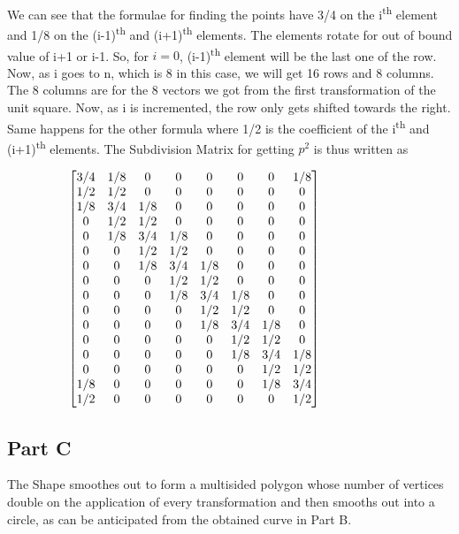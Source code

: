 \documentclass[12pt,a4paper]{article}
\begin{document}
We can see that the formulae for finding the points have 3/4 on the i\textsuperscript{th} element and 1/8 on the (i-1)\textsuperscript{th} and (i+1)\textsuperscript{th} elements. The elements rotate for out of bound value of i+1 or i-1. So, for $i=0$, (i-1)\textsuperscript{th} element will be the last one of the row. Now, as i goes to n, which is 8 in this case, we will get 16 rows and 8 columns. The 8 columns are for the 8 vectors we got from the first transformation of the unit square. Now, as i is incremented, the row only gets shifted towards the right. Same happens for the other formula where 1/2 is the coefficient of the i\textsuperscript{th} and (i+1)\textsuperscript{th} elements.
The Subdivision Matrix for getting $p^2$ is thus written as


\[ \hspace{-2cm}
 \begin{bmatrix} 
    3/4 & 1/8 & 0  & 0& 0 & 0 & 0 & 1/8 \\
    1/2 & 1/2 & 0 & 0 & 0 & 0 & 0 & 0\\
    1/8 & 3/4 & 1/8 & 0 & 0& 0 & 0 & 0\\
    0& 1/2 & 1/2 & 0 & 0 & 0 & 0 & 0\\
    0 & 1/8 & 3/4 & 1/8 & 0 & 0& 0 & 0\\
    0 & 0 & 1/2 & 1/2 & 0 & 0 & 0 & 0\\
    0 & 0 & 1/8 & 3/4 & 1/8 & 0 & 0& 0 \\
    0 & 0 & 0 & 1/2 & 1/2 & 0 & 0 & 0\\
    0 & 0 & 0 & 1/8 & 3/4 & 1/8 & 0 & 0\\
    0 & 0 & 0 & 0 & 1/2 & 1/2 & 0 & 0\\
    0 & 0 & 0 & 0 & 1/8 & 3/4 & 1/8 & 0 \\
    0 & 0 & 0 & 0 & 0 & 1/2 & 1/2 & 0\\
    0 & 0 & 0 & 0 & 0 & 1/8 & 3/4 & 1/8\\
    0 & 0 & 0 & 0 & 0 & 0 & 1/2 & 1/2\\
    1/8 & 0 & 0 & 0 & 0 & 0 & 1/8 & 3/4\\
    1/2 & 0 & 0 & 0 & 0 & 0 & 0 & 1/2\\
\end{bmatrix}
 \]
\subsection{Part C}

The Shape smoothes out to form a multisided polygon whose number of vertices double on the application of every transformation and then smooths out into a circle, as can be anticipated from the obtained curve in Part B.
\end{document}

